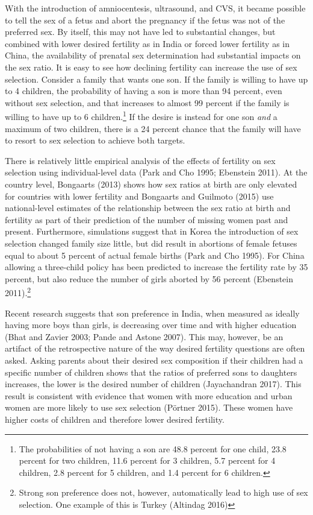 \documentclass[]{article}
\begin{document}
With the introduction of amniocentesis, ultrasound, and CVS, it became possible to tell the sex of a fetus and abort the pregnancy if the fetus was not of the preferred sex. By itself, this may not have led to substantial changes, but combined with lower desired fertility as in India or forced lower fertility as in China, the availability of prenatal sex determination had substantial impacts on the sex ratio. It is easy to see how declining fertility can increase the use of sex selection. Consider a family that wants one son. If the family is willing to have up to 4 children, the probability of having a son is more than 94 percent, even without sex selection, and that increases to almost 99 percent if the family is willing to have up to 6 children.\footnote{The probabilities of not having a son are 48.8 percent for one child, 23.8 percent for two children, 11.6 percent for 3 children, 5.7 percent for 4 children, 2.8 percent for 5 children, and 1.4 percent for 6 children.} If the desire is instead for one son \emph{and} a maximum of two children, there is a 24 percent chance that the family will have to resort to sex selection to achieve both targets.

There is relatively little empirical analysis of the effects of fertility on sex selection using individual-level data (Park and Cho 1995; Ebenstein 2011). At the country level, Bongaarts (2013) shows how sex ratios at birth are only elevated for countries with lower fertility and Bongaarts and Guilmoto (2015) use national-level estimates of the relationship between the sex ratio at birth and fertility as part of their prediction of the number of missing women past and present. Furthermore, simulations suggest that in Korea the introduction of sex selection changed family size little, but did result in abortions of female fetuses equal to about 5 percent of actual female births (Park and Cho 1995). For China allowing a three-child policy has been predicted to increase the fertility rate by 35 percent, but also reduce the number of girls aborted by 56 percent (Ebenstein 2011).\footnote{Strong son preference does not, however, automatically lead to high use of sex selection. One example of this is Turkey (Altindag 2016)}

Recent research suggests that son preference in India, when measured as ideally having more boys than girls, is decreasing over time and with higher education (Bhat and Zavier 2003; Pande and Astone 2007). This may, however, be an artifact of the retrospective nature of the way desired fertility questions are often asked. Asking parents about their desired sex composition if their children had a specific number of children shows that the ratios of preferred sons to daughters increases, the lower is the desired number of children (Jayachandran 2017). This result is consistent with evidence that women with more education and urban women are more likely to use sex selection (Pörtner 2015). These women have higher costs of children and therefore lower desired fertility.
\end{document}
